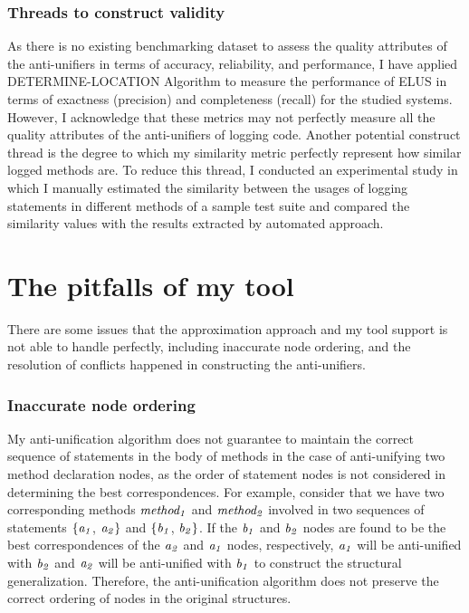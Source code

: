  
\subsubsection{Threads to construct validity}  \label{construct_threads} 
As there is no existing benchmarking dataset to assess the quality attributes of the anti-unifiers in terms of accuracy, reliability, and performance, I have applied DETERMINE-LOCATION Algorithm to measure the performance of ELUS in terms of exactness (precision) and completeness (recall) for the studied systems. However, I acknowledge that these metrics may not perfectly measure all the quality attributes of the anti-unifiers of logging code. Another potential construct thread is the degree to which my similarity metric perfectly represent how similar logged methods are. To reduce this thread, I conducted an experimental study in which I manually estimated the similarity between the usages of logging statements in different methods of a sample test suite and compared the similarity values with the results extracted by automated approach.



\section{The pitfalls of my tool}  \label{limitations}
There are some issues that the approximation approach and my tool support is not able to handle perfectly, including inaccurate node ordering, and the resolution of conflicts happened in constructing the anti-unifiers.


\subsubsection{Inaccurate node ordering}  \label{mismatch}
My anti-unification algorithm does not guarantee to maintain the correct sequence of statements in the body of methods in the case of anti-unifying two method declaration nodes, as the order of statement nodes is not considered in determining the best correspondences. For example, consider that we have two corresponding methods $\mathit{method_1}$ and $\mathit{method_2}$ involved in two sequences of statements $\{\mathit{a_1}$, $\mathit{a_2}\}$ and $\{\mathit{b_1}$, $\mathit{b_2}\}$. If the $\mathit{b_1}$ and $\mathit{b_2}$ nodes are found to be the best correspondences of the $\mathit{a_2}$ and $\mathit{a_1}$ nodes, respectively, $\mathit{a_1}$ will be anti-unified with $\mathit{b_2}$  and $\mathit{a_2}$ will be anti-unified with $\mathit{b_1}$ to construct the structural generalization. Therefore, the anti-unification algorithm does not preserve the correct ordering of nodes in the original structures.

